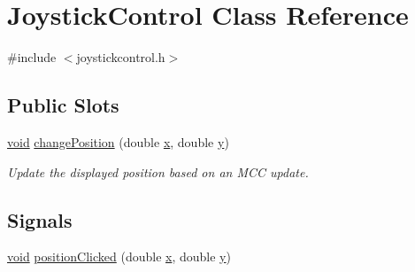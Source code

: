 \hypertarget{class_joystick_control}{\section{\-Joystick\-Control \-Class \-Reference}
\label{class_joystick_control}
}


{\ttfamily \#include $<$joystickcontrol.\-h$>$}

\subsection*{\-Public \-Slots}
\begin{DoxyCompactItemize}
\item 
\hyperlink{group___u_a_v_objects_plugin_ga444cf2ff3f0ecbe028adce838d373f5c}{void} \hyperlink{group___g_c_s_control_gadget_plugin_ga38032aee1ab31edefa56c0274624604c}{change\-Position} (double \hyperlink{_o_p_plots_8m_a9336ebf25087d91c818ee6e9ec29f8c1}{x}, double \hyperlink{_o_p_plots_8m_a2fb1c5cf58867b5bbc9a1b145a86f3a0}{y})
\begin{DoxyCompactList}\small\item\em \-Update the displayed position based on an \-M\-C\-C update. \end{DoxyCompactList}\end{DoxyCompactItemize}
\subsection*{\-Signals}
\begin{DoxyCompactItemize}
\item 
\hyperlink{group___u_a_v_objects_plugin_ga444cf2ff3f0ecbe028adce838d373f5c}{void} \hyperlink{class_joystick_control_aaafa394863c435c5d4c82f85cdd16b89}{position\-Clicked} (double \hyperlink{_o_p_plots_8m_a9336ebf25087d91c818ee6e9ec29f8c1}{x}, double \hyperlink{_o_p_plots_8m_a2fb1c5cf58867b5bbc9a1b145a86f3a0}{y})
\end{DoxyCompactItemize}
